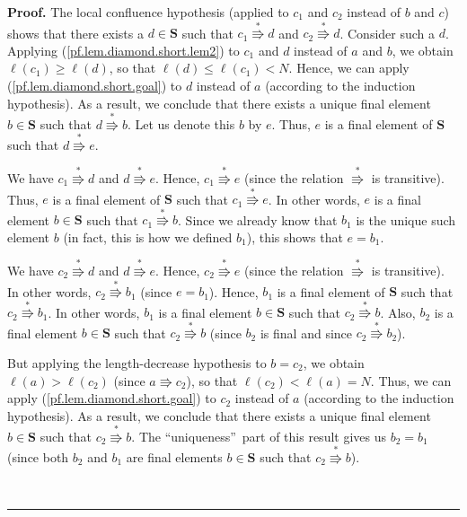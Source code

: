 \documentclass[numbers=enddot,12pt,final,onecolumn,notitlepage]{scrartcl}%
\theoremstyle{definition}
\newenvironment{proof}[1][Proof]{\noindent\textbf{#1.} }{\ \rule{0.5em}{0.5em}}
\newenvironment{vershort}{}{}
\begin{document}
\begin{vershort}
\begin{proof}
The local confluence hypothesis (applied to $c_{1}$ and $c_{2}$ instead of $b$
and $c$) shows that there exists a $d\in\mathbf{S}$ such that $c_{1}%
\overset{\ast}{\Rrightarrow}d$ and $c_{2}\overset{\ast}{\Rrightarrow}d$.
Consider such a $d$. Applying (\ref{pf.lem.diamond.short.lem2}) to $c_{1}$ and
$d$ instead of $a$ and $b$, we obtain $\ell\left(  c_{1}\right)  \geq
\ell\left(  d\right)  $, so that $\ell\left(  d\right)  \leq\ell\left(
c_{1}\right)  <N$. Hence, we can apply (\ref{pf.lem.diamond.short.goal}) to
$d$ instead of $a$ (according to the induction hypothesis). As a result, we
conclude that there exists a unique final element $b\in\mathbf{S}$ such that
$d\overset{\ast}{\Rrightarrow}b$. Let us denote this $b$ by $e$. Thus, $e$ is
a final element of $\mathbf{S}$ such that $d\overset{\ast}{\Rrightarrow}e$.

We have $c_{1}\overset{\ast}{\Rrightarrow}d$ and $d\overset{\ast
}{\Rrightarrow}e$. Hence, $c_{1}\overset{\ast}{\Rrightarrow}e$ (since the
relation $\overset{\ast}{\Rrightarrow}$ is transitive). Thus, $e$ is a final
element of $\mathbf{S}$ such that $c_{1}\overset{\ast}{\Rrightarrow}e$. In
other words, $e$ is a final element $b\in\mathbf{S}$ such that $c_{1}%
\overset{\ast}{\Rrightarrow}b$. Since we already know that $b_{1}$ is the
unique such element $b$ (in fact, this is how we defined $b_{1}$), this
shows that $e=b_{1}$.

We have $c_{2}\overset{\ast}{\Rrightarrow}d$ and $d\overset{\ast
}{\Rrightarrow}e$. Hence, $c_{2}\overset{\ast}{\Rrightarrow}e$ (since the
relation $\overset{\ast}{\Rrightarrow}$ is transitive). In other words,
$c_{2}\overset{\ast}{\Rrightarrow}b_{1}$ (since $e=b_{1}$). Hence, $b_{1}$ is
a final element of $\mathbf{S}$ such that $c_{2}\overset{\ast}{\Rrightarrow
}b_{1}$. In other words, $b_{1}$ is a final element $b\in\mathbf{S}$ such that
$c_{2}\overset{\ast}{\Rrightarrow}b$. Also, $b_{2}$ is a final element
$b\in\mathbf{S}$ such that $c_{2}\overset{\ast}{\Rrightarrow}b$ (since $b_{2}$
is final and since $c_{2}\overset{\ast}{\Rrightarrow}b_{2}$).

But applying the length-decrease hypothesis to $b=c_{2}$, we obtain
$\ell\left(  a\right)  >\ell\left(  c_{2}\right)  $ (since $a\Rrightarrow
c_{2}$), so that $\ell\left(  c_{2}\right)  <\ell\left(  a\right)  =N$. Thus,
we can apply (\ref{pf.lem.diamond.short.goal}) to $c_{2}$ instead of $a$
(according to the induction hypothesis). As a result, we conclude that there
exists a unique final element $b\in\mathbf{S}$ such that $c_{2}\overset{\ast
}{\Rrightarrow}b$. The \textquotedblleft uniqueness\textquotedblright\ part of
this result gives us $b_{2}=b_{1}$ (since both $b_{2}$ and $b_{1}$ are final
elements $b\in\mathbf{S}$ such that $c_{2}\overset{\ast}{\Rrightarrow}b$).


\end{proof}
\end{vershort}
\end{document}
